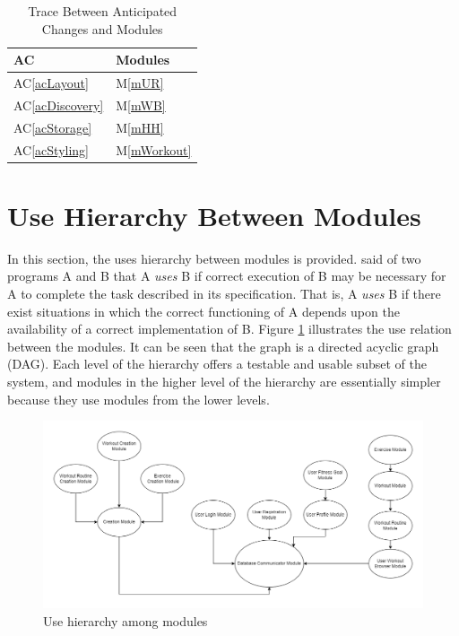 \documentclass[12pt, titlepage]{article}
\newcommand{\acref}[1]{AC\ref{#1}}
\newcommand{\mref}[1]{M\ref{#1}}
\begin{document}
\begin{table}[H]
\centering
\begin{tabular}{p{} p{}}
\toprule
\textbf{AC} & \textbf{Modules}\\
\midrule
\acref{acLayout} & \mref{mUR}\\
\acref{acDiscovery} & \mref{mWB}\\
\acref{acStorage} & \mref{mHH}\\
\acref{acStyling} & \mref{mWorkout}\\
\bottomrule
\end{tabular}
\caption{Trace Between Anticipated Changes and Modules}
\label{TblACT}
\end{table}

\section{Use Hierarchy Between Modules} \label{SecUse}

In this section, the uses hierarchy between modules is
provided. \citet{Parnas1978} said of two programs A and B that A {\em uses} B if
correct execution of B may be necessary for A to complete the task described in
its specification. That is, A {\em uses} B if there exist situations in which
the correct functioning of A depends upon the availability of a correct
implementation of B.  Figure \ref{FigUH} illustrates the use relation between
the modules. It can be seen that the graph is a directed acyclic graph
(DAG). Each level of the hierarchy offers a testable and usable subset of the
system, and modules in the higher level of the hierarchy are essentially simpler
because they use modules from the lower levels.

\begin{figure}[H]
\centering
\includegraphics[width=1.1\textwidth,height=0.6\textwidth]{UsesHierarchy.png}
\caption{Use hierarchy among modules}
\label{FigUH}
\end{figure}
\end{document}

